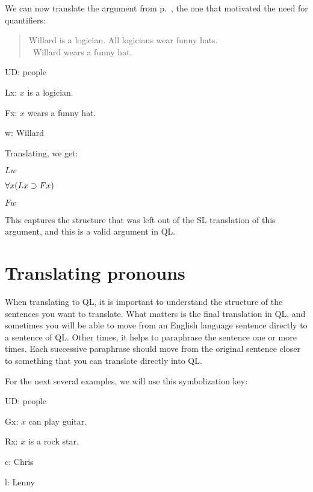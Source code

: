 We can now translate the argument from p.~\pageref{willard1}, the one that motivated the need for quantifiers:
\begin{quote}
Willard is a logician. All logicians wear funny hats.\\
\therefore\ Willard wears a funny hat.
\end{quote}
\begin{ekey}
\item[UD:] people
\item[Lx:] $x$ is a logician.
\item[Fx:] $x$ wears a funny hat.
\item[w:] Willard
\end{ekey}
Translating, we get:
\begin{earg}
\item[] $Lw$
\item[] $\forall x(Lx \supset Fx)$
\item[\therefore] $Fw$
\end{earg}

This captures the structure that was left out of the SL translation of this argument, and this is a valid argument in QL.













\section{Translating pronouns}
When translating to QL, it is important to understand the structure of the sentences you want to translate. What matters is the final translation in QL, and sometimes you will be able to move from an English language sentence directly to a sentence of QL. Other times, it helps to paraphrase the sentence one or more times. Each successive paraphrase should move from the original sentence closer to something that you can translate directly into QL.

For the next several examples, we will use this symbolization key:

\begin{ekey}
\item[UD:] people
\item[Gx:] $x$ can play guitar.
\item[Rx:] $x$ is a rock star.
\item[c:] Chris
\item[l:] Lenny
\end{ekey}

